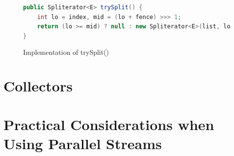 \documentclass[oneside, a4paper, 11pt]{article}
\begin{document}
\begin{figure}[H]
\begin{lstlisting}[language=Java]
public Spliterator<E> trySplit() {
    int lo = index, mid = (lo + fence) >>> 1;
    return (lo >= mid) ? null : new Spliterator<E>(list, lo, index = mid);
}
\end{lstlisting}
\caption{Implementation of trySplit()}
\label{fig:trySplit}
\end{figure}

\section{Collectors}
\section{Practical Considerations when Using Parallel Streams}
\end{document}
